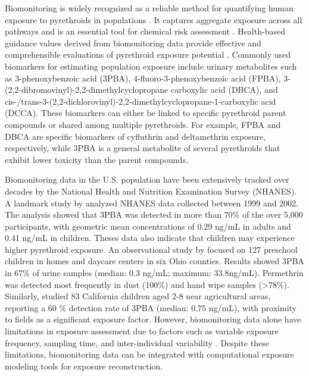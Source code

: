 \documentclass[toxics,article,submit,pdftex,moreauthors]{Definitions/mdpi}
\begin{document}
Biomonitoring is widely recognized as a reliable method for quantifying
human exposure to pyrethroids in populations
\citep{barr2010urinary, quindroit2021estimating, tarazona2022tiered}. It
captures aggregate exposure across all pathways and is an essential tool
for chemical risk assessment
\citep{blount2007perchlorate, sobus2015uses}. Health-based guidance
values derived from biomonitoring data provide effective and
comprehensible evaluations of pyrethroid exposure potential
\citep{apel2023human}. Commonly used biomarkers for estimating population
exposure include urinary metabolites such as 3-phenoxybenzoic acid
(3PBA), 4-fluoro-3-phenoxybenzoic acid (FPBA),
3-(2,2-dibromovinyl)-2,2-dimethylcyclopropane carboxylic acid (DBCA),
and
cis-/trans-3-(2,2-dichlorovinyl)-2,2-dimethylcyclopropane-1-carboxylic
acid (DCCA). These biomarkers can either be linked to specific
pyrethroid parent compounds or shared among multiple pyrethroids. For
example, FPBA and DBCA are specific biomarkers of cyfluthrin and deltamethrin exposure,
respectively, while 3PBA is a general metabolite of several pyrethroids that
exhibit lower toxicity than the parent compounds.

Biomonitoring data in the U.S. population have been extensively tracked over decades by the
National Health and Nutrition Examination Survey (NHANES). A
landmark study by \citet{barr2010urinary} analyzed NHANES data collected
between 1999 and 2002. The analysis showed that 3PBA was detected in more than 70\% of the over 5,000
participants, with geometric mean concentrations of 0.29 ng/mL in adults and
0.41 ng/mL in children. Theses data also indicate that children may experience higher
pyrethroid exposure. An observational study by \citet{morgan2007observational}
focused on 127 preschool children in homes and daycare centers in six Ohio
counties. Results showed 3PBA in 67\% of urine samples (median: 0.3 ng/mL;
maximum: 33.8ng/mL). Permethrin was detected most frequently in dust (100\%) and
hand wipe samples (>78\%). Similarly, \citet{trunnelle2014urinary} studied 83
California children aged 2-8 near agricultural areas, reporting a 60 \%
detection rate of 3PBA (median: 0.75 ng/mL), with proximity to fields as a
significant exposure factor. However, biomonitoring data alone have limitations
in exposure assessment due to factors such as variable exposure frequency,
sampling time, and inter-individual variability \citep{aylward2017variation}.
Despite these limitations, biomonitoring data can be integrated with
computational exposure modeling tools for exposure reconstruction.
\end{document}
